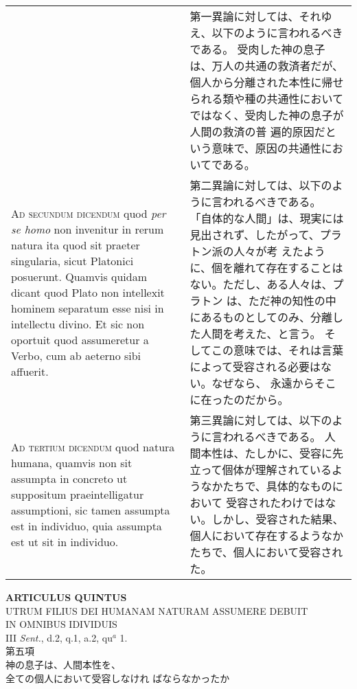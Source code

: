 \documentclass[10pt]{jsarticle} %
\begin{document}
\begin{longtable}{p{21em}p{21em}}
&

第一異論に対しては、それゆえ、以下のように言われるべきである。
受肉した神の息子は、万人の共通の救済者だが、個人から分離された本性に帰せ
 られる類や種の共通性においてではなく、受肉した神の息子が人間の救済の普
 遍的原因だという意味で、原因の共通性においてである。


\\



{\scshape Ad secundum dicendum} quod {\itshape per se homo} non invenitur in rerum natura ita
quod sit praeter singularia, sicut Platonici posuerunt. Quamvis quidam
dicant quod Plato non intellexit hominem separatum esse nisi in
intellectu divino. Et sic non oportuit quod assumeretur a Verbo, cum ab
aeterno sibi affuerit.


&

第二異論に対しては、以下のように言われるべきである。
「自体的な人間」は、現実には見出されず、したがって、プラトン派の人々が考
 えたように、個を離れて存在することはない。ただし、ある人々は、プラトン
 は、ただ神の知性の中にあるものとしてのみ、分離した人間を考えた、と言う。
 そしてこの意味では、それは言葉によって受容される必要はない。なぜなら、
 永遠からそこに在ったのだから。



\\



{\scshape Ad tertium dicendum} quod natura humana, quamvis non sit assumpta in
concreto ut suppositum praeintelligatur assumptioni, sic tamen assumpta
est in individuo, quia assumpta est ut sit in individuo.


&

第三異論に対しては、以下のように言われるべきである。
人間本性は、たしかに、受容に先立って個体が理解されているようなかたちで、具体的なものにおいて
 受容されたわけではない。しかし、受容された結果、個人において存在するようなかたちで、個人において受容された。

\\



\end{longtable}
\newpage




\begin{center}
 {\Large {\bf ARTICULUS QUINTUS}}\\
 {\large UTRUM FILIUS DEI HUMANAM NATURAM ASSUMERE DEBUIT\\ IN OMNIBUS IDIVIDUIS}\\
 {\footnotesize III {\itshape Sent.}, d.2, q.1, a.2, qu$^a$ 1.}\\
 {\Large 第五項\\神の息子は、人間本性を、\\全ての個人において受容しなけれ
 ばならなかったか}
\end{center}
\end{document}
